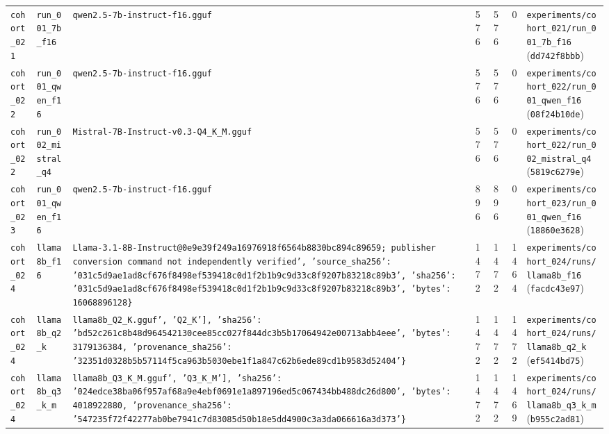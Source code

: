 {\begin{longtable}{@{}>{\raggedright\arraybackslash}p{1.5cm}>{\raggedright\arraybackslash}p{2.7cm}>{\raggedright\arraybackslash}p{3.2cm}rrr>{\raggedright\arraybackslash}p{4.2cm}@{}}
\texttt{cohort\_021} & \texttt{run\_001\_7b\_f16} & \texttt{qwen2.5-\allowbreak{}7b-\allowbreak{}instruct-\allowbreak{}f16.gguf} & 576 & 576 & 0 & \texttt{experiments/\allowbreak{}cohort\_021/\allowbreak{}run\_001\_7b\_f16} (\texttt{dd742f8bbb}) \\
\texttt{cohort\_022} & \texttt{run\_001\_qwen\_f16} & \texttt{qwen2.5-\allowbreak{}7b-\allowbreak{}instruct-\allowbreak{}f16.gguf} & 576 & 576 & 0 & \texttt{experiments/\allowbreak{}cohort\_022/\allowbreak{}run\_001\_qwen\_f16} (\texttt{08f24b10de}) \\
\texttt{cohort\_022} & \texttt{run\_002\_mistral\_q4} & \texttt{Mistral-\allowbreak{}7B-\allowbreak{}Instruct-\allowbreak{}v0.3-\allowbreak{}Q4\_K\_M.gguf} & 576 & 576 & 0 & \texttt{experiments/\allowbreak{}cohort\_022/\allowbreak{}run\_002\_mistral\_q4} (\texttt{5819c6279e}) \\
\texttt{cohort\_023} & \texttt{run\_001\_qwen\_f16} & \texttt{qwen2.5-\allowbreak{}7b-\allowbreak{}instruct-\allowbreak{}f16.gguf} & 896 & 896 & 0 & \texttt{experiments/\allowbreak{}cohort\_023/\allowbreak{}run\_001\_qwen\_f16} (\texttt{18860e3628}) \\
\texttt{cohort\_024} & \texttt{llama8b\_f16} & \texttt{Llama-\allowbreak{}3.1-\allowbreak{}8B-\allowbreak{}Instruct@0e9e39f249a16976918f6564b8830bc894c89659; publisher conversion command not independently verified', 'source\_sha256': '031c5d9ae1ad8cf676f8498ef539418c0d1f2b1b9c9d33c8f9207b83218c89b3', 'sha256': '031c5d9ae1ad8cf676f8498ef539418c0d1f2b1b9c9d33c8f9207b83218c89b3', 'bytes': 16068896128\}} & 1472 & 1472 & 1464 & \texttt{experiments/\allowbreak{}cohort\_024/\allowbreak{}runs/\allowbreak{}llama8b\_f16} (\texttt{facdc43e97}) \\
\texttt{cohort\_024} & \texttt{llama8b\_q2\_k} & \texttt{llama8b\_Q2\_K.gguf', 'Q2\_K'], 'sha256': 'bd52c261c8b48d964542130cee85cc027f844dc3b5b17064942e00713abb4eee', 'bytes': 3179136384, 'provenance\_sha256': '32351d0328b5b57114f5ca963b5030ebe1f1a847c62b6ede89cd1b9583d52404'\}} & 1472 & 1472 & 1472 & \texttt{experiments/\allowbreak{}cohort\_024/\allowbreak{}runs/\allowbreak{}llama8b\_q2\_k} (\texttt{ef5414bd75}) \\
\texttt{cohort\_024} & \texttt{llama8b\_q3\_k\_m} & \texttt{llama8b\_Q3\_K\_M.gguf', 'Q3\_K\_M'], 'sha256': '024edce38ba06f957af68a9e4ebf0691e1a897196ed5c067434bb488dc26d800', 'bytes': 4018922880, 'provenance\_sha256': '547235f72f42277ab0be7941c7d83085d50b18e5dd4900c3a3da066616a3d373'\}} & 1472 & 1472 & 1469 & \texttt{experiments/\allowbreak{}cohort\_024/\allowbreak{}runs/\allowbreak{}llama8b\_q3\_k\_m} (\texttt{b955c2ad81}) \\

\end{longtable}}
